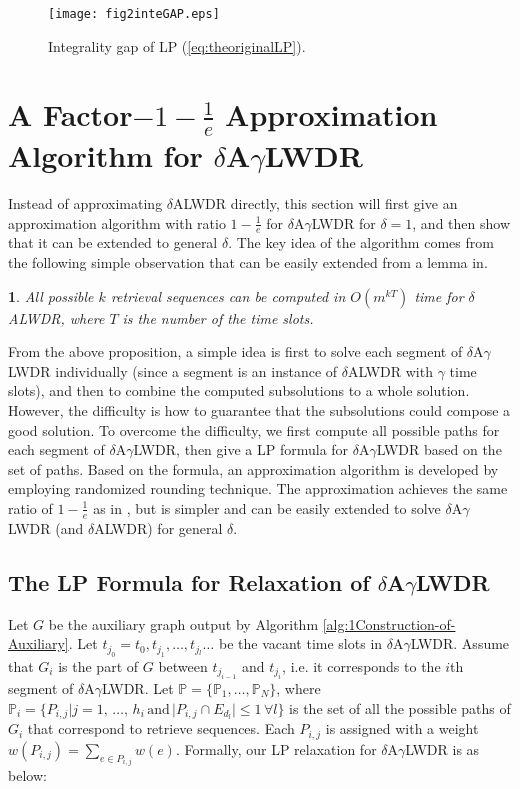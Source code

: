 \documentclass[11pt,english,onecolumn,draftcls]{IEEEtran}
\theoremstyle{plain}
\theoremstyle{plain}
\newtheorem{prop}[thm]{\protect\propositionname}
\theoremstyle{plain}
\theoremstyle{plain}
\providecommand{\propositionname}{Proposition}
\begin{document}
\begin{figure}
\texttt{[image: fig2inteGAP.eps]}

\protect\caption{\label{fig:Integrality-Gap-of}Integrality gap of LP (\ref{eq:theoriginalLP}). }
\end{figure}



\section{A Factor$-1-\frac{1}{e}$ Approximation Algorithm for $\delta$A$\gamma$LWDR}

Instead of approximating $\delta$ALWDR directly, this section will
first give an approximation algorithm with ratio $1-\frac{1}{e}$
for $\delta$A$\gamma$LWDR for $\delta=1$, and then show that it
can be extended to general $\delta$. The key idea of the algorithm
comes from the following simple observation that can be easily extended
from a lemma in\cite{lu2014data}.
\begin{prop}
All possible $k$ retrieval sequences can be computed in $O(m^{kT})$
time for $\delta$ALWDR, where $T$ is the number of the time slots.
\end{prop}
From the above proposition, a simple idea is first to solve each segment
of $\delta$A$\gamma$LWDR individually (since a segment is an instance
of $\delta$ALWDR with $\gamma$ time slots), and then to combine
the computed subsolutions to a whole solution. However, the difficulty
is how to guarantee that the subsolutions could compose a good solution.
To overcome the difficulty, we first compute all possible paths for
each segment of $\delta$A$\gamma$LWDR, then give a LP formula for
$\delta$A$\gamma$LWDR based on the set of paths. Based on the formula,
an approximation algorithm is developed by employing randomized rounding
technique. The approximation achieves the same ratio of $1-\frac{1}{e}$ as
in \cite{lu2014data}, but is simpler and can be easily extended to
solve $\delta$A$\gamma$LWDR (and $\delta$ALWDR) for general $\delta$.


\subsection{The LP Formula for Relaxation of $\delta$A$\gamma$LWDR}

Let $G$ be the auxiliary graph output by Algorithm \ref{alg:1Construction-of-Auxiliary}.
Let $t_{j_{0}}=t_{0},t_{j_{1}},\dots,t_{j{}_{l}}\dots$ be the vacant
time slots in $\delta$A$\gamma$LWDR. Assume that $G_{i}$ is the
part of $G$ between $t_{j_{i-1}}$ and $t_{j_{i}}$, i.e. it corresponds
to the $i$th segment of $\delta$A$\gamma$LWDR. Let $\mathbb{P}=\{\mathbb{P}_{1},\dots,\mathbb{P}_{N}\}$,
where $\mathbb{P}_{i}=\{P_{i,j}\vert j=1,\,\dots,\, h_{i}\,\mbox{and}\,\vert P_{i,j}\cap E_{d_{l}}\vert\leq1\,\forall l\}$
is the set of all the possible paths of $G_{i}$ that correspond to
retrieve sequences. Each $P_{i,j}$ is assigned with a weight $w(P_{i,j})=\sum_{e\in P_{i,j}}w(e)$.
Formally, our LP relaxation for $\delta$A$\gamma$LWDR is as below:
\end{document}

